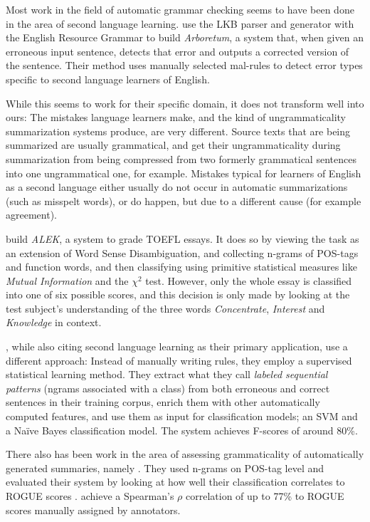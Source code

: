 \documentclass[a4paper,10pt]{scrartcl}
\theoremstyle{style}
\begin{document}
Most work in the field of automatic grammar checking seems to have been done in the area of second language learning.
\cite{bender2004arboretum} use the LKB parser and generator \cite{copestake2002implementing} with the English Resource Grammar \citep{flickinger2000building} to build \textit{Arboretum}, a system that, when given an erroneous input sentence, detects that error and outputs a corrected version of the sentence. Their method uses manually selected mal-rules \citep{schneider1998recognizing} to detect error types specific to second language learners of English.

While this seems to work for their specific domain, it does not transform well into ours: The mistakes language learners make, and the kind of ungrammaticality summarization systems produce, are very different. Source texts that are being summarized are usually grammatical, and get their ungrammaticality during summarization from being compressed from two formerly grammatical sentences into one ungrammatical one, for example. Mistakes typical for learners of English as a second language either usually do not occur in automatic summarizations (such as misspelt words), or do happen, but due to a different cause (for example agreement).

\cite{chodorow2000unsupervised} build \textit{ALEK}, a system to grade TOEFL essays. It does so by viewing the task as an extension of Word Sense Disambiguation, and collecting n-grams of POS-tags and function words, and then classifying using primitive statistical measures like \textit{Mutual Information} and the $\chi^2$ test. However, only the whole essay is classified into one of six possible scores, and this decision is only made by looking at the test subject's understanding of the three words \textit{Concentrate}, \textit{Interest} and \textit{Knowledge} in context.

\cite{sun2007detecting}, while also citing second language learning as their primary application, use a different approach: Instead of manually writing rules, they employ a supervised statistical learning method. They extract what they call \textit{labeled sequential patterns} (ngrams associated with a class) from both erroneous and correct sentences in their training corpus, enrich them with other automatically computed features, and use them as input for classification models; an SVM \citep[SVMlight,][]{Joachims/02a} and a Na\"ive Bayes classification model. The system achieves F-scores of around 80\%.

There also has been work in the area of assessing grammaticality of automatically generated summaries, namely \cite{vadlapudi2010automated}. They used n-grams on POS-tag level and evaluated their system by looking at how well their classification correlates to ROGUE scores \citep{lin2004rouge}. \citeauthor{vadlapudi2010automated} achieve a Spearman's $\rho{}$ correlation of up to 77\% to ROGUE scores manually assigned by annotators.
\end{document}
